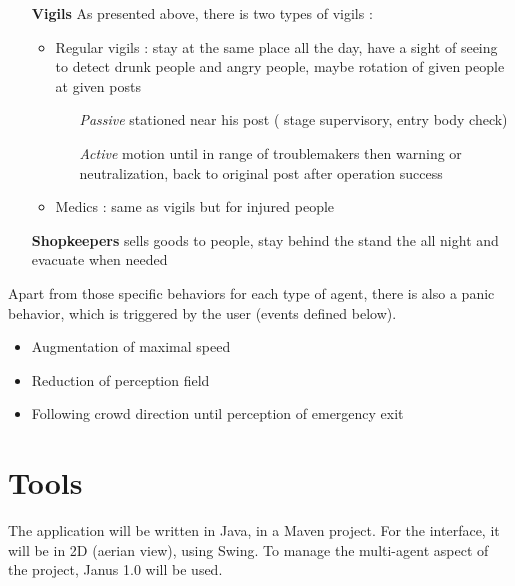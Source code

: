 \begin{itemize}
	\item[{\bf Vigils}] As presented above, there is two types of vigils :
		\begin{itemize}
			\item Regular vigils : stay at the same place all the day, have
			a sight of seeing to detect drunk people and angry people, maybe
			rotation of given people at given posts
			\begin{itemize}
				\item[\emph{Passive}] stationed near his post ( stage
				supervisory, entry body check)
				\item[\emph{Active}] motion until in range of troublemakers
				then warning or neutralization, back to original post after
				operation success
			\end{itemize}
			\item Medics : same as vigils but for injured people
		\end{itemize}

	\item[{\bf Shopkeepers}] sells goods to people, stay behind the stand the
	all night and evacuate when needed
\end{itemize}

Apart from those specific behaviors for each type of agent, there is also
a panic behavior, which is triggered by the user (events defined
below).

\begin{itemize}
	\item Augmentation of maximal speed
	\item Reduction of perception field
	\item Following crowd direction until perception of emergency exit
\end{itemize}

\section{Tools}

The application will be written in Java, in a Maven project. For the interface,
it will be in 2D (aerian view), using Swing. To manage the multi-agent aspect of
the project, Janus 1.0 will be used.
